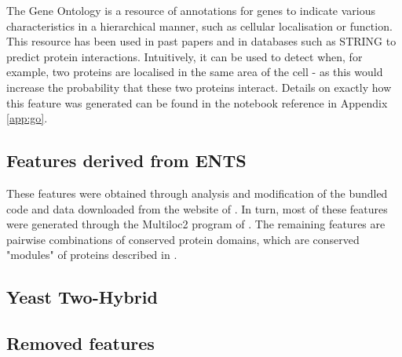 The Gene Ontology\autocite{ashburner_gene_2000} is a resource of annotations for genes to indicate various characteristics in a hierarchical manner, such as cellular localisation or function.
This resource has been used in past papers\autocite{qi_evaluation_2006} and in databases such as STRING\autocite{von-mering_string:_2005} to predict protein interactions.
Intuitively, it can be used to detect when, for example, two proteins are localised in the same area of the cell - as this would increase the probability that these two proteins interact.
Details on exactly how this feature was generated can be found in the notebook reference in Appendix \ref{app:go}.

\subsection{Features derived from ENTS}

These features were obtained through analysis and modification of the bundled code and data downloaded from the website of \textcite{rodgers-melnick_predicting_2013}.
In turn, most of these features were generated through the Multiloc2 program of \textcite{blum_multiloc2:_2009}.
The remaining features are pairwise combinations of conserved protein domains, which are conserved "modules" of proteins described in \textcite{janin_domains_1985}.

\subsection{Yeast Two-Hybrid}


\subsection{Removed features}




